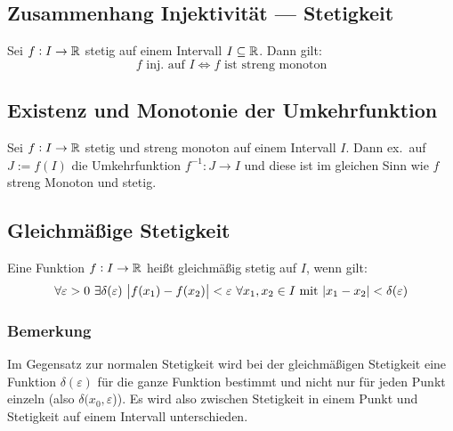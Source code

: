 \subsection{Zusammenhang Injektivität --- Stetigkeit}
Sei $f: I \rightarrow \mathbb{R}$ stetig auf einem Intervall $I \subseteq \mathbb{R}$. Dann
gilt:
\begin{equation*}
    f \text{ inj.\ auf }I \Leftrightarrow
    f \text{ ist streng monoton}
\end{equation*}

\subsection{Existenz und Monotonie der Umkehrfunktion}
Sei $f: I \rightarrow \mathbb{R}$ stetig und streng monoton auf einem Intervall $I$.
Dann ex.\ auf $J := f(I)$ die Umkehrfunktion $f^{-1}: J \rightarrow I$
und diese ist  im gleichen Sinn wie $f$ streng Monoton und stetig.

\subsection{Gleichmäßige Stetigkeit}
Eine Funktion $f: I \rightarrow \mathbb{R}$ heißt gleichmäßig stetig auf $I$, wenn gilt:
\begin{equation*}
    \forall \varepsilon > 0\ \exists \delta(\varepsilon)\
    \abs{f(x_1) - f(x_2)} < \varepsilon\ \forall x_1, x_2 \in I \text{ mit }
    \abs{x_1 - x_2} < \delta(\varepsilon)
\end{equation*}

\subsubsection{Bemerkung}
Im Gegensatz zur normalen Stetigkeit wird bei der gleichmäßigen Stetigkeit eine
Funktion $\delta(\varepsilon)$ für die ganze Funktion bestimmt und nicht nur
für jeden Punkt einzeln (also $\delta(x_0, \varepsilon$)). Es wird also
zwischen Stetigkeit in einem Punkt und Stetigkeit auf einem Intervall
unterschieden.
